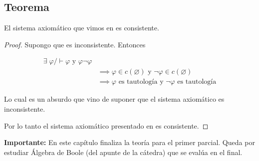 \subsection{Teorema}

\begin{teorema}{}{}
    El sistema axiomático que vimos en 
    es consistente.
\end{teorema}


\begin{proof} \phantom{.}

    Supongo que es inconsistente. Entonces

    \begin{align*}
        \exists \; \varphi / \vdash \varphi \text{ y } \varphi \neg \varphi&\\
        &\implies \varphi \in c(\varnothing) \text{ y } 
        \neg\varphi \in c(\varnothing) \\
        &\implies \varphi \text{ es tautología y } 
        \neg \varphi \text{ es tautología}
    \end{align*}

    Lo cual es un absurdo que vino de suponer que el sistema axiomático
    es inconsistente.
    
    Por lo tanto el sistema axiomático presentado en 
     es consistente.

\end{proof}


\bigskip

\bigskip

\textbf{Importante:} En este capítulo finaliza la teoría para el primer 
parcial. Queda por estudiar Álgebra de Boole (del apunte de la cátedra) que 
se evalúa en el final.
